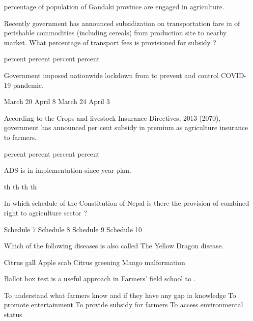 \begin{questions}
\question \fillin[][3cm] percentage of population of Gandaki province are engaged in agriculture.
\begin{choices}
\end{choices}

\question Recently government has announced subsidization on transportation fare in of perishable commodities (including cereals) from production site to nearby market. What percentage of transport fees is provisioned for subsidy ?
\begin{choices}
 percent
 percent
 percent
 percent
\end{choices}

\question Government imposed nationwide lockdown from \fillin[][3cm] to prevent and control COVID-19 pandemic.
\begin{choices}
\choice March 20
\choice April 8
\CorrectChoice March 24
\choice April 3
\end{choices}

\question According to the Crops and livestock Insurance Directives, 2013 (2070), government has announced \fillin[][3cm] per cent subsidy in premium as agriculture insurance to farmers.
\begin{choices}
 percent
 percent
 percent
 percent
\end{choices}

\question ADS is in implementation since \fillin[][3cm] year plan.
\begin{choices}
 th
 th
 th
 th
\end{choices}

\question In which schedule of the Constitution of Nepal is there the provision of combined right to agriculture sector ?
\begin{choices}
\choice Schedule 7
\choice Schedule 8
\CorrectChoice Schedule 9
\choice Schedule 10
\end{choices}

\question Which of the following diseases is also called The Yellow Dragon disease.
\begin{choices}
\choice Citrus gall
\choice Apple scab
\CorrectChoice Citrus greening
\choice Mango malformation
\end{choices}

\question Ballot box test is a useful approach in Farmers' field school to \fillin[][3cm].\begin{choices}
\CorrectChoice To understand what farmers know and if they have any gap in knowledge
\choice To promote entertainment
\choice To provide subsidy for farmers
\choice To access environmental status
\end{choices}


\end{questions}
